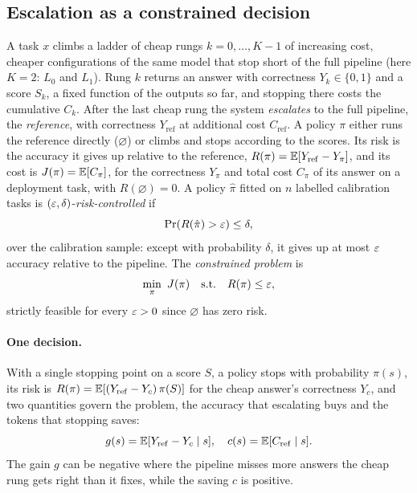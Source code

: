 \subsection{Escalation as a constrained decision}
\label{sec:problem}

A task $x$ climbs a ladder of cheap rungs $k = 0, \dots, K-1$ of increasing cost, cheaper configurations of
the same model that stop short of the full pipeline (here $K = 2$: $L_0$ and $L_1$). Rung $k$ returns an answer with correctness $Y_k \in \{0,1\}$ and a score
$S_k$, a fixed function of the outputs so far, and stopping there costs the cumulative $C_k$. After the last cheap rung
the system \emph{escalates} to the full pipeline, the \emph{reference}, with correctness
$Y_{\mathrm{ref}}$ at additional cost $C_{\mathrm{ref}}$. A policy $\pi$ either runs the reference directly
($\varnothing$) or climbs and stops according to the scores. Its risk is the accuracy it gives up relative
to the reference, $R(\pi) = \mathbb{E}[Y_{\mathrm{ref}} - Y_\pi]$, and its cost is $J(\pi) = \mathbb{E}[C_\pi]$, for the correctness $Y_\pi$ and total cost $C_\pi$ of its answer on a deployment task, with
$R(\varnothing) = 0$. A policy $\hat\pi$ fitted on $n$ labelled calibration tasks is
$(\varepsilon,\delta)$-\emph{risk-controlled} if
\begin{equation}
  \Pr\!\left(R(\hat\pi)>\varepsilon\right) \le \delta,
  \label{eq:risk-control}
\end{equation}
over the calibration sample: except with probability $\delta$, it gives up at most $\varepsilon$ accuracy
relative to the pipeline. The \emph{constrained problem} is
\begin{equation}
  \min_\pi \ J(\pi) \quad \text{s.t.} \quad R(\pi) \le \varepsilon ,
  \label{eq:constrained}
\end{equation}
strictly feasible for every $\varepsilon > 0$ since $\varnothing$ has zero risk.

\paragraph{One decision.} With a single stopping point on a score $S$, a policy stops with probability
$\pi(s)$, its risk is $R(\pi) = \mathbb{E}[(Y_{\mathrm{ref}} - Y_c)\,\pi(S)]$ for the cheap answer's correctness
$Y_c$, and two quantities govern the problem, the accuracy that escalating buys and the tokens that stopping saves:
\begin{equation}
  g(s) = \mathbb{E}[Y_{\mathrm{ref}} - Y_c \mid s], \quad c(s) = \mathbb{E}[C_{\mathrm{ref}} \mid s] .
  \label{eq:gain}
\end{equation}
The gain $g$ can be negative where the pipeline misses more answers the cheap rung gets right than it fixes, while the saving $c$ is positive.
